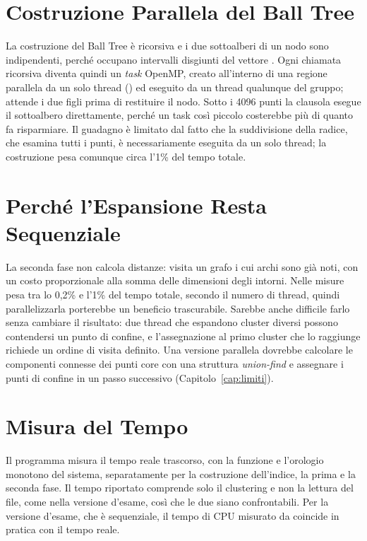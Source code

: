\section{Costruzione Parallela del Ball Tree}

La costruzione del Ball Tree è ricorsiva e i due sottoalberi di un nodo sono indipendenti, perché occupano intervalli disgiunti del vettore . Ogni chiamata ricorsiva diventa quindi un \emph{task} OpenMP, creato all'interno di una regione parallela da un solo thread () ed eseguito da un thread qualunque del gruppo;  attende i due figli prima di restituire il nodo. Sotto i 4096 punti la clausola  esegue il sottoalbero direttamente, perché un task così piccolo costerebbe più di quanto fa risparmiare. Il guadagno è limitato dal fatto che la suddivisione della radice, che esamina tutti i punti, è necessariamente eseguita da un solo thread; la costruzione pesa comunque circa l'1\% del tempo totale.

\section{Perché l'Espansione Resta Sequenziale}

La seconda fase non calcola distanze: visita un grafo i cui archi sono già noti, con un costo proporzionale alla somma delle dimensioni degli intorni. Nelle misure pesa tra lo 0,2\% e l'1\% del tempo totale, secondo il numero di thread, quindi parallelizzarla porterebbe un beneficio trascurabile. Sarebbe anche difficile farlo senza cambiare il risultato: due thread che espandono cluster diversi possono contendersi un punto di confine, e l'assegnazione al primo cluster che lo raggiunge richiede un ordine di visita definito. Una versione parallela dovrebbe calcolare le componenti connesse dei punti core con una struttura \emph{union-find} e assegnare i punti di confine in un passo successivo (Capitolo~\ref{cap:limiti}).

\section{Misura del Tempo}

Il programma misura il tempo reale trascorso, con la funzione  e l'orologio monotono del sistema, separatamente per la costruzione dell'indice, la prima e la seconda fase. Il tempo riportato comprende solo il clustering e non la lettura del file, come nella versione d'esame, così che le due siano confrontabili. Per la versione d'esame, che è sequenziale, il tempo di CPU misurato da  coincide in pratica con il tempo reale.
